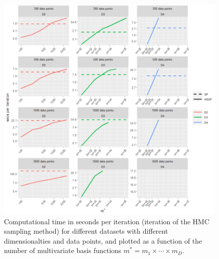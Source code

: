 

\begin{figure}
\centering
\includegraphics[width=\textwidth, trim = 0mm 0mm 0mm 0mm, clip]{fig_time_nD_log.png}
\caption{Computational time in seconds per iteration (iteration of the HMC sampling method) for different datasets with different dimensionalties and data points, and plotted as a function of the number of multivariate basis functions $m^*=m_1\times \cdots \times m_D$.}
  \label{fig_time_nD_log}
\end{figure}

